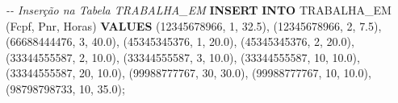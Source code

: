 \documentclass[
]{article}
\newenvironment{Shaded}{\begin{snugshade}}{\end{snugshade}}
\newcommand{\CommentTok}[1]{\textcolor[rgb]{0.56,0.35,0.01}{\textit{#1}}}
\newcommand{\DecValTok}[1]{\textcolor[rgb]{0.00,0.00,0.81}{#1}}
\newcommand{\FloatTok}[1]{\textcolor[rgb]{0.00,0.00,0.81}{#1}}
\newcommand{\KeywordTok}[1]{\textcolor[rgb]{0.13,0.29,0.53}{\textbf{#1}}}
\newcommand{\NormalTok}[1]{#1}
\newcommand{\StringTok}[1]{\textcolor[rgb]{0.31,0.60,0.02}{#1}}
\begin{document}
\begin{Shaded}
\begin{Highlighting}[]
\CommentTok{{-}{-} Inserção na Tabela TRABALHA\_EM}
\KeywordTok{INSERT} \KeywordTok{INTO}\NormalTok{ TRABALHA\_EM (Fcpf, Pnr, Horas) }\KeywordTok{VALUES}
\NormalTok{(}\StringTok{\textquotesingle{}12345678966\textquotesingle{}}\NormalTok{, }\DecValTok{1}\NormalTok{, }\FloatTok{32.5}\NormalTok{),}
\NormalTok{(}\StringTok{\textquotesingle{}12345678966\textquotesingle{}}\NormalTok{, }\DecValTok{2}\NormalTok{, }\FloatTok{7.5}\NormalTok{),}
\NormalTok{(}\StringTok{\textquotesingle{}66688444476\textquotesingle{}}\NormalTok{, }\DecValTok{3}\NormalTok{, }\FloatTok{40.0}\NormalTok{),}
\NormalTok{(}\StringTok{\textquotesingle{}45345345376\textquotesingle{}}\NormalTok{, }\DecValTok{1}\NormalTok{, }\FloatTok{20.0}\NormalTok{),}
\NormalTok{(}\StringTok{\textquotesingle{}45345345376\textquotesingle{}}\NormalTok{, }\DecValTok{2}\NormalTok{, }\FloatTok{20.0}\NormalTok{),}
\NormalTok{(}\StringTok{\textquotesingle{}33344555587\textquotesingle{}}\NormalTok{, }\DecValTok{2}\NormalTok{, }\FloatTok{10.0}\NormalTok{),}
\NormalTok{(}\StringTok{\textquotesingle{}33344555587\textquotesingle{}}\NormalTok{, }\DecValTok{3}\NormalTok{, }\FloatTok{10.0}\NormalTok{),}
\NormalTok{(}\StringTok{\textquotesingle{}33344555587\textquotesingle{}}\NormalTok{, }\DecValTok{10}\NormalTok{, }\FloatTok{10.0}\NormalTok{),}
\NormalTok{(}\StringTok{\textquotesingle{}33344555587\textquotesingle{}}\NormalTok{, }\DecValTok{20}\NormalTok{, }\FloatTok{10.0}\NormalTok{),}
\NormalTok{(}\StringTok{\textquotesingle{}99988777767\textquotesingle{}}\NormalTok{, }\DecValTok{30}\NormalTok{, }\FloatTok{30.0}\NormalTok{),}
\NormalTok{(}\StringTok{\textquotesingle{}99988777767\textquotesingle{}}\NormalTok{, }\DecValTok{10}\NormalTok{, }\FloatTok{10.0}\NormalTok{),}
\NormalTok{(}\StringTok{\textquotesingle{}98798798733\textquotesingle{}}\NormalTok{, }\DecValTok{10}\NormalTok{, }\FloatTok{35.0}\NormalTok{);}
\end{Highlighting}
\end{Shaded}
\end{document}
